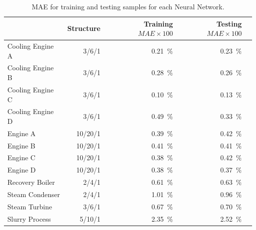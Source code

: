 \begin{table}[!t]
\caption{MAE for training and testing samples for each Neural Network.}
\label{tbl:mae}
  \centering
\begin{tabular}{lrrrr} \toprule
 & Structure  & Training $MAE \times 100$ & Testing $MAE \times100$ \\ \midrule
Cooling Engine A & 3/6/1 & \SI{0.21}{\percent} & \SI{0.23}{\percent} \\
Cooling Engine B & 3/6/1  & \SI{0.28}{\percent} & \SI{0.26}{\percent} \\
Cooling Engine C & 3/6/1  & \SI{0.10}{\percent} & \SI{0.13}{\percent} \\
Cooling Engine D & 3/6/1  & \SI{0.49}{\percent} & \SI{0.33}{\percent} \\
 Engine A & 10/20/1  & \SI{0.39}{\percent} & \SI{0.42}{\percent} \\
 Engine B & 10/20/1  & \SI{0.41}{\percent} & \SI{0.41}{\percent} \\
 Engine C & 10/20/1  & \SI{0.38}{\percent} & \SI{0.42}{\percent} \\
 Engine D & 10/20/1  & \SI{0.38}{\percent} & \SI{0.37}{\percent} \\
 Recovery Boiler & 2/4/1  & \SI{0.61}{\percent} & \SI{0.63}{\percent} \\
 Steam Condenser & 2/4/1  & \SI{1.01}{\percent} & \SI{0.96}{\percent} \\
 Steam Turbine & 3/6/1  & \SI{0.67}{\percent} & \SI{0.70}{\percent} \\
 Slurry Process & 5/10/1  & \SI{2.35}{\percent} & \SI{2.52}{\percent} \\
 \bottomrule
\end{tabular}
\vspace{-0.3cm}

\end{table}

